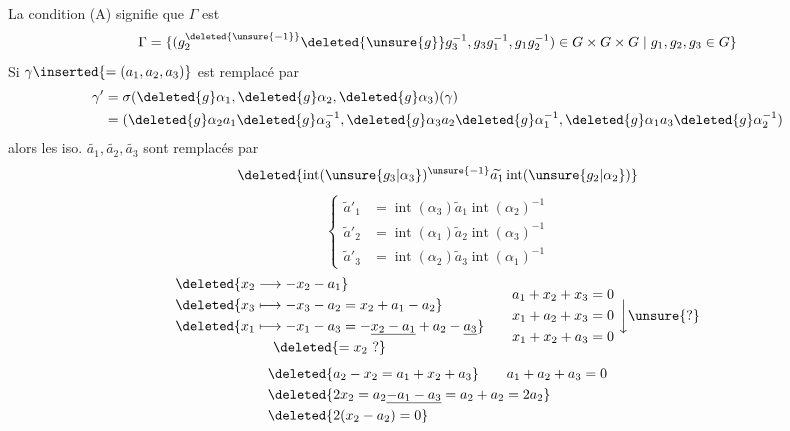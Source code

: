 La condition (A) signifie que \(\Gamma\) est  
\[
 \Gamma=\{(g_2^{\deleted{\unsure{-1}}}\deleted{\unsure{g}}g_3^{-1},g_3g_1^{-1},g_1g_2^{-1})
 \in G\times G\times G\mid g_1,g_2,g_3\in G\}
\]
Si \(\gamma\inserted{=(a_1,a_2,a_3)}\) est remplacé par
\[
\begin{aligned}
 \gamma'&=\sigma(\deleted{g}\alpha_1,\deleted{g}\alpha_2,\deleted{g}\alpha_3)(\gamma)\\
 &=(\deleted{g}\alpha_2 a_1\deleted{g}\alpha_3^{-1},\deleted{g}\alpha_3 a_2\deleted{g}\alpha_1^{-1},
 \deleted{g}\alpha_1 a_3\deleted{g}\alpha_2^{-1})
\end{aligned}
\]
alors les iso. \(\widetilde{a_{1}},\widetilde{a_{2}},\widetilde{a_{3}}\) sont remplacés par
\[
 \deleted{\operatorname{int}(\unsure{g_3|\alpha_3})^{\unsure{-1}}\widetilde{a_{1}}\operatorname{int}(\unsure{g_2|\alpha_2})}
\]
\[
 \left\{\begin{aligned}
 \widetilde a'_1&=\operatorname{int}(\alpha_3)\widetilde a_1\operatorname{int}(\alpha_2)^{-1}\\
 \widetilde a'_2&=\operatorname{int}(\alpha_1)\widetilde a_2\operatorname{int}(\alpha_3)^{-1}\\
 \widetilde a'_3&=\operatorname{int}(\alpha_2)\widetilde a_3\operatorname{int}(\alpha_1)^{-1}
 \end{aligned}\right.
\]
\[
\begin{aligned}
 &\deleted{x_2\longrightarrow-x_2-a_1}\\
 &\deleted{x_3\longmapsto-x_3-a_2=x_2+a_1-a_2}\\
 &\deleted{x_1\longmapsto-x_1-a_3=-\underline{x_2-a_1}+a_2-\underline{a_3}}\\
 &\hspace{7em}\deleted{=x_2\ ?}
\end{aligned}\qquad
\begin{aligned}
 a_1+x_2+x_3&=0\\
 x_1+a_2+x_3&=0\\
 x_1+x_2+a_3&=0
\end{aligned}\ \bigg\downarrow\unsure{?}
\]
\[
\begin{aligned}
 &\deleted{a_2-x_2=a_1+x_2+a_3}\qquad a_1+a_2+a_3=0\\
 &\deleted{2x_2=a_2\underline{-a_1-a_3}=a_2+a_2=2a_2}\\
 &\deleted{2(x_2-a_2)=0}
\end{aligned}
\]

